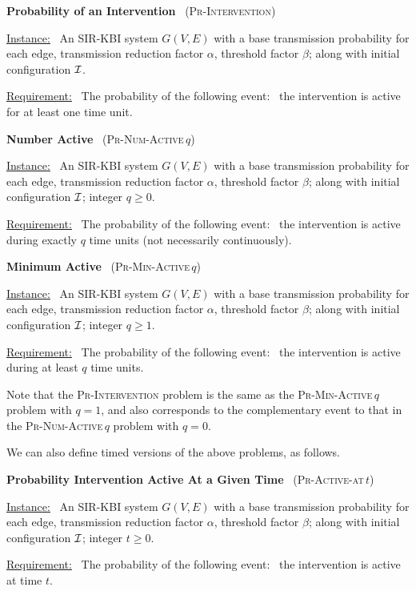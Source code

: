 \documentclass[11pt]{article}
\newcommand{\cali}{\mbox{${\cal I}$}}
\newcommand{\Int}{\textsc{Pr-Intervention}}
\newcommand{\tActiveAt}{\mbox{\textsc{Pr-Active-at}$\,t$}}
\newcommand{\NumActive}{\mbox{\textsc{Pr-Num-Active}$\,q$}}
\newcommand{\MinActive}{\mbox{\textsc{Pr-Min-Active}$\,q$}}
\begin{document}
\noindent
\textbf{Probability of an Intervention}~ (\Int)

\medskip
\noindent
\underline{Instance:}~ An SIR-KBI system $G(V,E)$ with a base transmission probability for each edge,
transmission reduction factor $\alpha$, threshold factor $\beta$;
along with initial configuration \cali.

\smallskip
\noindent
\underline{Requirement:}~ The probability of the following
event:~ the intervention is active for at least one time unit.

\bigskip
\noindent
\textbf{Number Active}~ (\NumActive)

\medskip
\noindent
\underline{Instance:}~ An SIR-KBI system $G(V,E)$ with a base transmission probability for each edge,
transmission reduction factor $\alpha$, threshold factor $\beta$;
along with initial configuration \cali; integer $q \geq 0$.

\smallskip
\noindent
\underline{Requirement:}~ The probability of the following
event:~ the intervention is active during exactly $q$ time units (not necessarily continuously).

\bigskip
\noindent
\textbf{Minimum Active}~ (\MinActive)

\medskip
\noindent
\underline{Instance:}~ An SIR-KBI system $G(V,E)$ with a base transmission probability for each edge,
transmission reduction factor $\alpha$, threshold factor $\beta$;
along with initial configuration \cali; integer $q \geq 1$.

\smallskip
\noindent
\underline{Requirement:}~ The probability of the following
event:~ the intervention is active during at least $q$ time units.

\medskip
Note that the \Int{} problem is the same as the \MinActive{} problem with $q = 1$,
and also corresponds to the complementary event to that in the  \NumActive{} problem with $q = 0$.

\bigskip
We can also define timed versions of the above problems, as follows.

\bigskip
\noindent
\textbf{Probability Intervention Active At a Given Time}~ (\tActiveAt)

\medskip
\noindent
\underline{Instance:}~ An SIR-KBI system $G(V,E)$ with a base transmission probability for each edge,
transmission reduction factor $\alpha$, threshold factor $\beta$;
along with initial configuration \cali; integer $t \geq 0$.

\smallskip
\noindent
\underline{Requirement:}~ The probability of the following
event:~ the intervention is active at time $t$.
\end{document}
